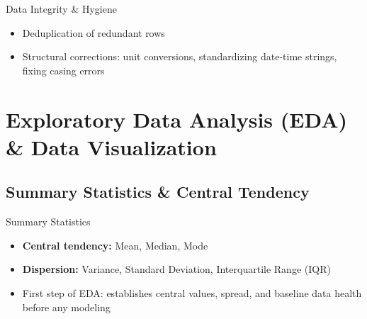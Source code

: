 \begin{frame}{Data Integrity \& Hygiene}
    \begin{itemize}
        \item Deduplication of redundant rows
        \item Structural corrections: unit conversions, standardizing date-time strings, fixing casing errors
    \end{itemize}
\end{frame}


\section{Exploratory Data Analysis (EDA) \& Data Visualization}

\subsection{Summary Statistics \& Central Tendency}


\begin{frame}{Summary Statistics}
    \begin{itemize}
        \item \textbf{Central tendency:} Mean, Median, Mode
        \item \textbf{Dispersion:} Variance, Standard Deviation, Interquartile Range (IQR)
        \item First step of EDA: establishes central values, spread, and baseline data health before any modeling
    \end{itemize}
\end{frame}


